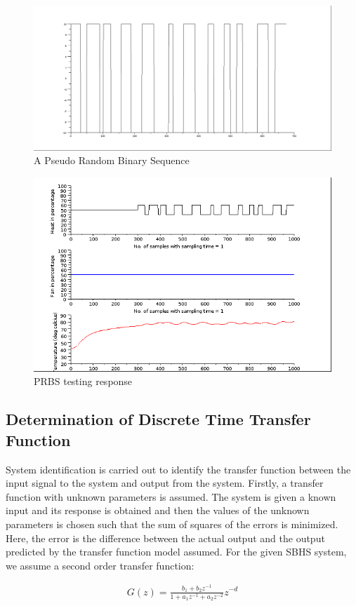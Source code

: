 \begin{figure}
\centering
\includegraphics[width=0.7\linewidth]{prbs/prbs-illustration.png}
\caption{A Pseudo Random Binary Sequence}
\label{prbs-fig}
\end{figure}

\begin{figure}
\centering
\includegraphics[width=0.7\linewidth]{prbs/prbs-expt.png}
\caption{PRBS testing response}
\label{prbs-res}
\end{figure}


\subsection{Determination of Discrete Time Transfer Function}\label{prbs-model}

System identification is carried out to identify the transfer function between the input signal to the system and output 
from the system. Firstly, a transfer function with unknown parameters is assumed. The system is given a known input and its
response is obtained and then the values of the unknown parameters is chosen such that the sum of squares of the errors is 
minimized. Here, the error is the difference between the actual output and the output predicted by the transfer function model
assumed.
For the given SBHS system, we assume a second order transfer function:

\begin{align}\label{DTF}
G(z)=\frac{b_{1}+b_{2}z^{-1}}{1+a_{1}z^{-1}+a_{2}z^{-2}}z^{-d}
\end{align}



